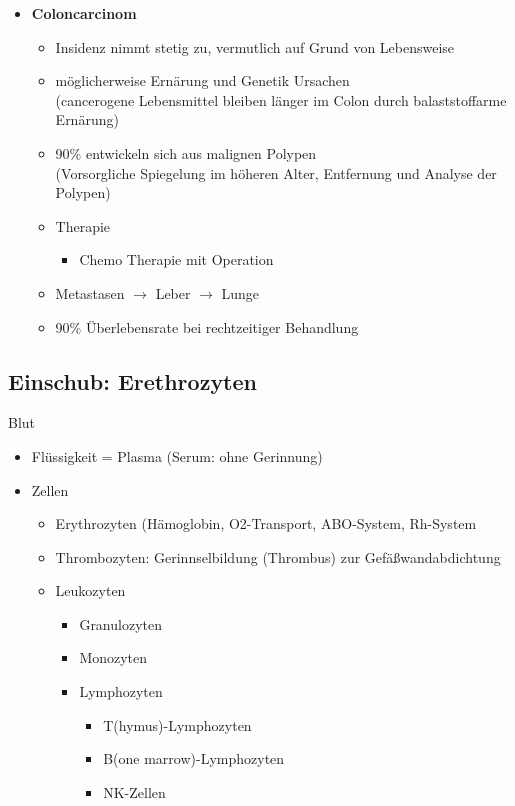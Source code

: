 \begin{itemize}
			\item \textbf{Coloncarcinom}
				\begin{itemize}
					\item Insidenz nimmt stetig zu, vermutlich auf Grund von Lebensweise
					\item möglicherweise Ernärung und Genetik Ursachen\\
						(cancerogene Lebensmittel bleiben länger im Colon durch balaststoffarme Ernärung)
					\item 90\% entwickeln sich aus malignen Polypen\\
						(Vorsorgliche Spiegelung im höheren Alter, Entfernung und Analyse der Polypen)
					\item Therapie
						\begin{itemize}
							\item Chemo Therapie mit Operation
						\end{itemize}
					\item Metastasen $\rightarrow$ Leber $\rightarrow$ Lunge 
					\item 90\% Überlebensrate bei rechtzeitiger Behandlung
				\end{itemize}
				
		\end{itemize}
		\subsection{Einschub: Erethrozyten}
		Blut
			\begin{itemize}
				\item Flüssigkeit = Plasma (Serum: ohne Gerinnung)
				\item Zellen
					\begin{itemize}
						\item Erythrozyten (Hämoglobin, O2-Transport, ABO-System, Rh-System
						\item Thrombozyten: Gerinnselbildung (Thrombus) zur Gefäßwandabdichtung
						\item Leukozyten
							\begin{itemize}
								\item Granulozyten
								\item Monozyten	
								\item Lymphozyten
									\begin{itemize}
										\item T(hymus)-Lymphozyten
										\item B(one marrow)-Lymphozyten
										\item NK-Zellen
									\end{itemize}
							\end{itemize}
								
					\end{itemize}
			\end{itemize}